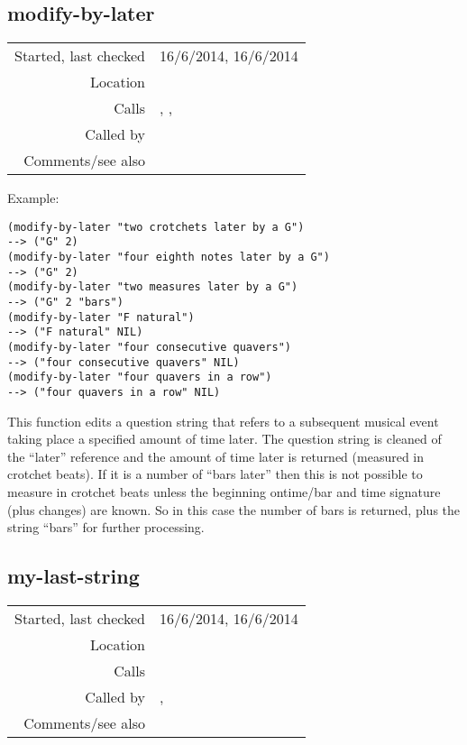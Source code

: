 \subsection*{modify-by-later}\label{fun:modify-by-later}

\vspace{0.3cm}
\begin{tabular}{r|p{8cm}}
Started, last checked & 16/6/2014, 16/6/2014 \\
Location & \nameref{sec:analytic-string-manipulations} \\
Calls & \nameref{fun:number-string2numeric}, \nameref{fun:number-n-note2time-interval}, \nameref{fun:replace-all} \\
Called by & \nameref{fun:followed-by-splitter} \\
Comments/see also &
\end{tabular}

\vspace{0.5cm}
\noindent Example:
\begin{verbatim}
(modify-by-later "two crotchets later by a G")
--> ("G" 2)
(modify-by-later "four eighth notes later by a G")
--> ("G" 2)
(modify-by-later "two measures later by a G")
--> ("G" 2 "bars")
(modify-by-later "F natural")
--> ("F natural" NIL)
(modify-by-later "four consecutive quavers")
--> ("four consecutive quavers" NIL)
(modify-by-later "four quavers in a row")
--> ("four quavers in a row" NIL)
\end{verbatim}

\noindent This function edits a question string that
refers to a subsequent musical event taking place a
specified amount of time later. The question string
is cleaned of the ``later'' reference and the amount
of time later is returned (measured in crotchet
beats). If it is a number of ``bars later'' then this
is not possible to measure in crotchet beats unless
the beginning ontime/bar and time signature (plus
changes) are known. So in this case the number of bars
is returned, plus the string ``bars'' for further
processing.


\subsection*{my-last-string}\label{fun:my-last-string}

\vspace{0.3cm}
\begin{tabular}{r|p{8cm}}
Started, last checked & 16/6/2014, 16/6/2014 \\
Location & \nameref{sec:analytic-string-manipulations} \\
Calls & \\
Called by & \nameref{fun:duration-n-pitch-class-time-intervals}, \nameref{fun:pitch-class-time-intervals} \\
Comments/see also & \nameref{fun:my-last}
\end{tabular}


